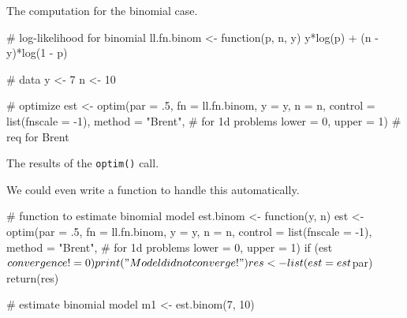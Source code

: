 \documentclass{beamer}
\begin{document}
\begin{frame}[fragile]
The computation for the binomial case.
\pause \begin{blockcode} 
# log-likelihood for binomial
ll.fn.binom <- function(p, n, y) {
  y*log(p) + (n - y)*log(1 - p)
}
\end{blockcode}

\pause \begin{blockcode}
# data
y <- 7
n <- 10
\end{blockcode}

\pause \begin{blockcode}
# optimize
est <- optim(par = .5, fn = ll.fn.binom, y = y, n = n,
             control = list(fnscale = -1),
             method = "Brent",  # for 1d problems
             lower = 0, upper = 1)  # req for Brent
\end{blockcode}
\end{frame}

\begin{frame}[fragile]
The results of the \texttt{optim()} call.
\end{frame}

\begin{frame}[fragile]
We could even write a function to handle this automatically.
\begin{small}
\pause \begin{blockcode} 
# function to estimate binomial model
est.binom <- function(y, n) {
  est <- optim(par = .5, fn = ll.fn.binom, y = y, n = n,
            control = list(fnscale = -1),
            method = "Brent",  # for 1d problems
            lower = 0, upper = 1)
  if (est$convergence != 0) print("Model did not converge!")
  res <- list(est = est$par)
  return(res)
}
\end{blockcode}

\pause \begin{blockcode}
# estimate binomial model
m1 <- est.binom(7, 10)
\end{blockcode}
\end{small}
\end{frame}
\end{document}
